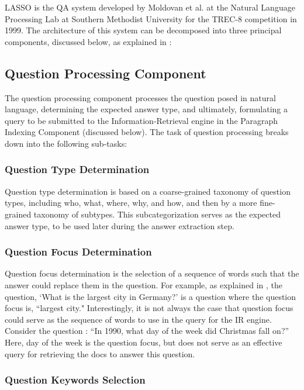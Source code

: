 LASSO \cite{moldovan_1999} is the QA system developed by Moldovan et al. at the Natural Language Processing Lab at Southern Methodist University for the TREC-8 competition in 1999.  The architecture of this system can be decomposed into three principal components, discussed below, as explained in \cite{moldovan_1999}:  

\subsection{Question Processing Component}

The question processing component processes the question posed in natural language, determining the expected answer type, and ultimately, formulating a query to be submitted to the Information-Retrieval engine in the Paragraph Indexing Component (discussed below).  The task of question processing breaks down into the following sub-tasks:

\subsubsection{Question Type Determination}

Question type determination is based on a coarse-grained taxonomy of question types, including who, what, where, why, and how, and then by a more fine-grained taxonomy of subtypes.  This subcategorization serves as the expected answer type, to be used later during the answer extraction step.

\subsubsection{Question Focus Determination}

Question focus determination is the selection of a sequence of words such that the answer could replace them in the question.  For example, as explained in \cite{moldovan_1999}, the question, `What is the largest city in Germany?' is a question where the question focus is, ``largest city."  Interestingly, it is not always the case that question focus could serve as the sequence of words to use in the query for the IR engine.   Consider the question \cite{moldovan_1999}: ``In 1990, what day of the week did Christmas fall on?”  Here, day of the week is the question focus, but does not serve as an effective query for retrieving the docs to answer this question.  

\subsubsection{Question Keywords Selection}

